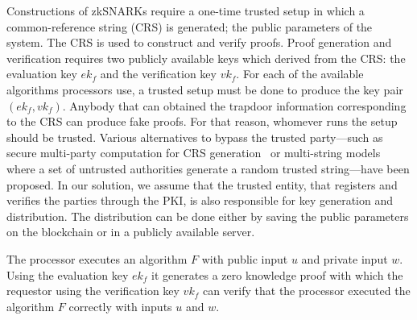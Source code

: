 Constructions of zkSNARKs require a one-time trusted setup in which a common-reference string (CRS) is generated; the public parameters of the system. The CRS is used to construct and verify proofs. Proof generation and verification requires two publicly available keys which derived from the CRS: the evaluation key $ek_f$ and the verification key $vk_f$. For each of the available algorithms processors use, a trusted setup must be done to produce the key pair $(ek_f, vk_f)$. Anybody that can obtained the trapdoor information corresponding to the CRS can produce fake proofs. For that reason, whomever runs the setup should be trusted. Various alternatives to bypass the trusted party---such as secure multi-party computation for CRS generation~\cite{zcash_mpc} or multi-string models~\cite{groth2014cryptography} where a set of untrusted authorities generate a random trusted string---have been proposed. In our solution, we assume that the trusted entity, that registers and verifies the parties through the PKI, is also responsible for key generation and distribution. The distribution can be done either by saving the public parameters on the blockchain or in a publicly available server.

The processor executes an algorithm $F$ with public input $u$ and private input $w$. Using  the evaluation key $ek_f$ it generates a zero knowledge proof with which the requestor using the verification key $vk_f$ can verify that the processor executed the algorithm $F$ correctly with inputs $u$ and $w$.

